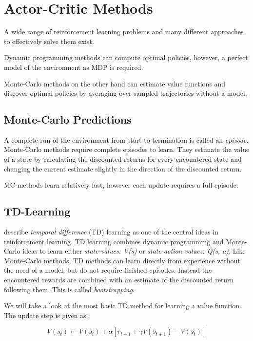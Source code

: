 \section{Actor-Critic Methods}
\raggedbottom 
A wide range of reinforcement learning problems and many different approaches to effectively solve them exist.

Dynamic programming methods can compute optimal policies, however, a perfect model of the environment as MDP is required.

Monte-Carlo methods on the other hand can estimate value functions and discover optimal policies by averaging over sampled trajectories without a model.

\subsection{Monte-Carlo Predictions}

A complete run of the environment from start to termination is called an \textit{episode}.
Monte-Carlo methods require complete episodes to learn. They estimate the value of a state by calculating the discounted returns for every encountered state and changing the current estimate slightly in the direction of the discounted return.

MC-methods learn relatively fast, however each update requires a full episode.

\subsection{TD-Learning}

\citet{Sut98} describe \textit{temporal difference} (TD) learning as one of the central ideas in reinforcement learning.
TD learning combines dynamic programming and Monte-Carlo ideas to learn either \textit{state-values: V(s)} or \textit{state-action values: Q(s, a)}.
Like Monte-Carlo methods, TD methods can learn directly from experience without the need of a model, but do not require finished episodes. Instead the encountered rewards are combined with an estimate of the discounted return following them. This is called \textit{bootstrapping}.

We will take a look at the most basic TD method for learning a value function. 
The update step is given as:

\begin{equation}
V(s_t)\gets V(s_t)+ \alpha [r_{t+1} + \gamma V(s_{t+1})-V(s_t)]
\end{equation}

